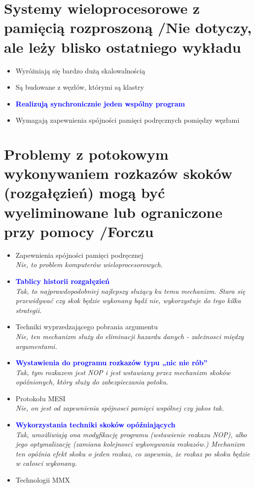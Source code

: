 \documentclass[a4paper,twoside]{article}
\begin{document}
\section{Systemy wieloprocesorowe z pamięcią rozproszoną {\small /Nie dotyczy, ale leży blisko ostatniego wykładu}}
	\begin{itemize}
    \item Wyróżniają się bardzo dużą skalowalnością
    \item Są budowane z węzłów, którymi są klastry
    \item \textcolor{Blue}{\textbf{Realizują synchronicznie jeden wspólny program}}
    \item Wymagają zapewnienia spójności pamięci podręcznych pomiędzy węzłami
    \end{itemize}

\section{Problemy z potokowym wykonywaniem rozkazów skoków (rozgałęzień) mogą być wyeliminowane lub ograniczone przy pomocy {\small /Forczu}}
	\begin{itemize}
    \item Zapewnienia spójności pamięci podręcznej\\
    {\small \emph{Nie, to problem komputerów wieloprocesorowych.}}
    \item \textcolor{Blue}{\textbf{Tablicy historii rozgałęzień}}\\
    {\small \emph{Tak, to najprawdopodobniej najlepszy służący ku temu mechanizm. Stara się przewidywać czy skok będzie wykonany bądź nie, wykorzystuje do tego kilka strategii.}}
    \item Techniki wyprzedzającego pobrania argumentu\\
    {\small \emph{Nie, ten mechanizm służy do eliminacji hazardu danych - zależnosci między argumentami.}}
    \item \textcolor{Blue}{\textbf{Wystawienia do programu rozkazów typu „nic nie rób”}}\\
    {\small \emph{Tak, tym rozkazem jest \emph{NOP} i jest wstawiany przez mechanizm skoków opóźnionych, który służy do zabezpieczania potoku.}}
    \item Protokołu MESI\\
    {\small \emph{Nie, on jest od zapewnienia spójnosci pamięci wspólnej czy jakos tak.}}
    \item \textcolor{Blue}{\textbf{Wykorzystania techniki skoków opóźniających}}\\
    {\small \emph{Tak, umożliwiają ona modyfikację programu (wstawienie rozkazu NOP), albo jego optymalizację (zamiana kolejnosci wykonywania rozkazów.) Mechanizm ten opóźnia efekt skoku o jeden rozkaz, co zapewnia, że rozkaz po skoku będzie w całosci wykonany.}}
    \item Technologii MMX
    \end{itemize}
\end{document}
